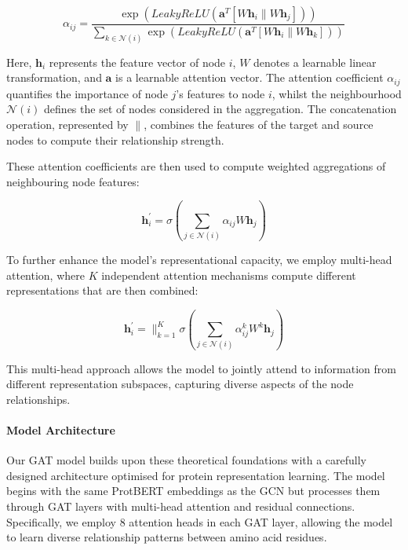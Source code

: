 \documentclass[12pt,a4paper]{article}
\begin{document}
\begin{equation}
    \alpha_{ij} = \frac{\exp\left(LeakyReLU\left(\mathbf{a}^T[W\mathbf{h}_i \| W\mathbf{h}_j]\right)\right)}{\sum_{k \in \mathcal{N}(i)} \exp\left(LeakyReLU\left(\mathbf{a}^T[W\mathbf{h}_i \| W\mathbf{h}_k]\right)\right)}
\end{equation}

Here, $\mathbf{h}_i$ represents the feature vector of node $i$, $W$ denotes a learnable linear transformation, and $\mathbf{a}$ is a learnable attention vector. The attention coefficient $\alpha_{ij}$ quantifies the importance of node $j$'s features to node $i$, whilst the neighbourhood $\mathcal{N}(i)$ defines the set of nodes considered in the aggregation. The concatenation operation, represented by $\|$, combines the features of the target and source nodes to compute their relationship strength.

These attention coefficients are then used to compute weighted aggregations of neighbouring node features:

\begin{equation}
    \mathbf{h}_i^{\prime} = \sigma\left(\sum_{j \in \mathcal{N}(i)} \alpha_{ij} W \mathbf{h}_j\right)
\end{equation}

To further enhance the model's representational capacity, we employ multi-head attention, where $K$ independent attention mechanisms compute different representations that are then combined:

\begin{equation}
    \mathbf{h}_i^{\prime} = \|_{k=1}^K \sigma\left(\sum_{j \in \mathcal{N}(i)} \alpha_{ij}^k W^k \mathbf{h}_j\right)
\end{equation}

This multi-head approach allows the model to jointly attend to information from different representation subspaces, capturing diverse aspects of the node relationships.

\paragraph{Model Architecture}

Our GAT model builds upon these theoretical foundations with a carefully designed architecture optimised for protein representation learning. The model begins with the same ProtBERT embeddings as the GCN but processes them through GAT layers with multi-head attention and residual connections. Specifically, we employ 8 attention heads in each GAT layer, allowing the model to learn diverse relationship patterns between amino acid residues.
\end{document}
